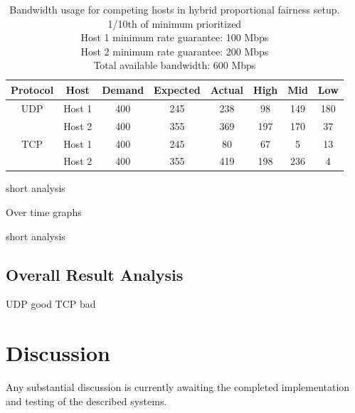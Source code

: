 \documentclass[accepted,single]{gipaper}
\begin{document}
\begin{table}[h]
	\label{hybr_c}
	\vspace{-3mm}
	\begin{center}
		\begin{small}
		\setlength\tabcolsep{1.5pt}
			\begin{tabular}{cccccccc}
				Protocol & Host & Demand & Expected & Actual & High & Mid & Low\\
				\hline
				UDP & Host 1 & 400 & 245 & 238 & 98 & 149 & 180\\
				    & Host 2 & 400 & 355 & 369 & 197 & 170 & 37\\
				\hline
				TCP & Host 1 & 400 & 245 & 80 & 67 & 5 & 13\\
				    & Host 2 & 400 & 355 & 419 & 198 & 236 & 4\\
			\end{tabular}
		\end{small}
	\end{center}
	\caption{Bandwidth usage for competing hosts in hybrid proportional fairness setup.\\
	1/10th of minimum prioritized\\
	Host 1 minimum rate guarantee: 100 Mbps\\
	Host 2 minimum rate guarantee: 200 Mbps\\	
	Total available bandwidth: 600 Mbps}
	\vspace{-3mm}
\end{table}

short analysis

Over time graphs

short analysis

\subsection{Overall Result Analysis}
\label{result_analysis}

UDP good
TCP bad


\section{Discussion}
\label{discussion}

Any substantial discussion is currently awaiting the completed implementation and testing of the described systems.
\end{document}

